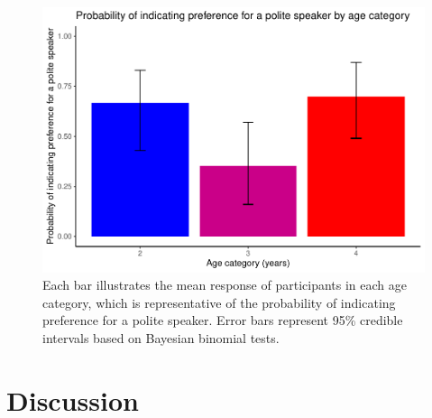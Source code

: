 \documentclass[
  english,
  man,floatsintext]{apa6}
\begin{document}
\begin{figure}
\centering
\includegraphics{writeup_files/figure-latex/unnamed-chunk-2-1.pdf}
\caption{\label{fig:unnamed-chunk-2}Each bar illustrates the mean response of participants in each age category, which is representative of the probability of indicating preference for a polite speaker. Error bars represent 95\% credible intervals based on Bayesian binomial tests.}
\end{figure}

\hypertarget{discussion}{%
\section{Discussion}\label{discussion}}
\end{document}
